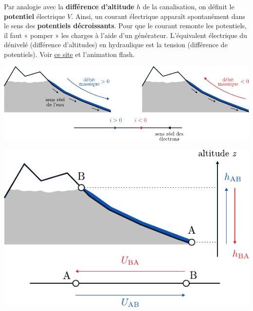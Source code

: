 \documentclass[../../main/main.tex]{subfiles}
\begin{document}
Par analogie avec la \textbf{différence d'altitude} $h$ de la canalisation, on
définit le \textbf{potentiel} électrique $V$. Ainsi, un courant électrique
apparaît spontanément dans le sens des \textbf{potentiels décroissants}. Pour
que le courant remonte les potentiels, il faut « pomper » les charges à l'aide
d'un générateur. L'équivalent électrique du dénivelé (différence d'altitudes) en
hydraulique est la tension (différence de potentiels). Voir
\href{https://www.pccl.fr/physique\_chimie\_college\_lycee/quatrieme/electricite/analogie\_hydraulique.htm}
{ce site} et l'animation flash.


\smallbreak
\noindent
\begin{minipage}[c]{.58\linewidth}
	\begin{center}
		\includegraphics[width=\linewidth]{anal_elec_debit}
	\end{center}
\end{minipage}
\hfill
\begin{minipage}[c]{.40\linewidth}
	\begin{center}
		\includegraphics[width=\linewidth]{anal_elec_pot}
	\end{center}
\end{minipage}
\end{document}
